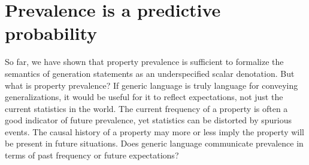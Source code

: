 \documentclass[12pt,letterpaper]{article}
\begin{document}



%

\section*{Prevalence is a predictive probability}

So far, we have shown that property prevalence is sufficient to formalize the semantics of generation statements as an underspecified scalar denotation.
But what is property prevalence?
If generic language is truly language for conveying generalizations, it would be useful for it to reflect expectations, not just the current statistics in the world.
The current frequency of a property is often a good indicator of future prevalence, yet statistics can be distorted by spurious events.
The causal history of a property may more or less imply the property will be present in future situations.
Does generic language communicate prevalence in terms of past frequency or future expectations?
\end{document}
